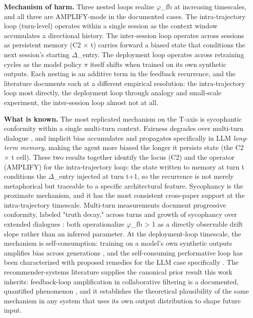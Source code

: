 \documentclass[10pt]{article}
\begin{document}
\textbf{Mechanism of harm.} Three nested loops realize $\varphi$\_fb at increasing timescales, and all three are AMPLIFY-mode in the documented cases. The intra-trajectory loop (turn-level) operates within a single session as the context window accumulates a directional history. The inter-session loop operates across sessions as persistent memory (C2 $\times$ t) carries forward a biased state that conditions the next session's starting $\Delta$\_entry. The deployment loop operates across retraining cycles as the model policy $\pi$ itself shifts when trained on its own synthetic outputs. Each nesting is an additive term in the feedback recurrence, and the literature documents each at a different empirical resolution: the intra-trajectory loop most directly, the deployment loop through analogy and small-scale experiment, the inter-session loop almost not at all.

\textbf{What is known.} The most replicated mechanism on the T-axis is sycophantic conformity within a single multi-turn context. Fairness degrades over multi-turn dialogue \cite{fan2024fairmt}, and implicit bias accumulates and propagates specifically in LLM \emph{long-term memory}, making the agent more biased the longer it persists state \cite{ma2026implicit} (the C2 $\times$ t cell). These two results together identify the locus (C2) and the operator (AMPLIFY) for the intra-trajectory loop: the state written to memory at turn t conditions the $\Delta$\_entry injected at turn t+1, so the recurrence is not merely metaphorical but traceable to a specific architectural feature. Sycophancy is the proximate mechanism, and it has the most consistent cross-paper support at the intra-trajectory timescale. Multi-turn measurements document progressive conformity, labeled "truth decay," across turns \cite{liu2025truth} and growth of sycophancy over extended dialogues \cite{hong2025measuring}: both operationalize $\varphi$\_fb > 1 as a directly observable drift slope rather than an inferred parameter. At the deployment-loop timescale, the mechanism is self-consumption: training on a model's own synthetic outputs amplifies bias across generations \cite{wyllie2024fairness}, and the self-consuming performative loop has been characterized with proposed remedies for the LLM case specifically \cite{wang2026observations}. The recommender-systems literature supplies the canonical prior result this work inherits: feedback-loop amplification in collaborative filtering is a documented, quantified phenomenon \cite{mansoury2020feedback}, and it establishes the theoretical plausibility of the same mechanism in any system that uses its own output distribution to shape future input.
\end{document}
